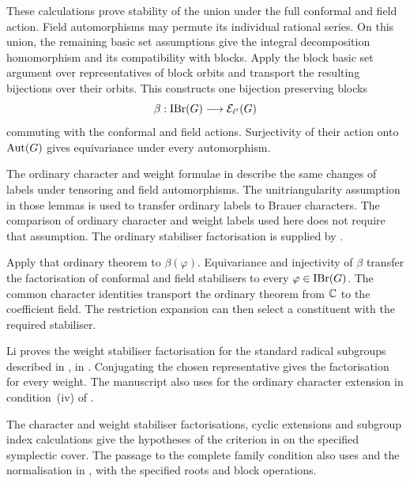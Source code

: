 These calculations prove stability of the union under the full conformal
and field action. Field automorphisms may permute its individual rational
series. On this union, the remaining basic set assumptions give the integral
decomposition homomorphism and its compatibility with blocks. Apply the
block basic set argument over representatives of block orbits and transport
the resulting bijections over their orbits.
This constructs one bijection preserving blocks
\[
 \beta:\operatorname{IBr}(G)\longrightarrow\mathcal E_{\ell'}(G)
\]
commuting with the conformal and field actions. Surjectivity of their
action onto $\operatorname{Aut}(G)$ gives equivariance under every automorphism.

The ordinary character and weight formulae in
\cite[proofs of Lemmas~5.1 and~5.3]{Li2021} describe the same changes of
labels under tensoring and field automorphisms. The unitriangularity
assumption in those lemmas is used to transfer ordinary labels to Brauer
characters. The comparison of ordinary character and weight labels used
here does not require that assumption.
The ordinary stabiliser factorisation is supplied by
\cite[Theorem~3.1]{CabanesSpath2017TypeC}.

Apply that ordinary theorem to $\beta(\varphi)$. Equivariance and
injectivity of $\beta$ transfer the factorisation of conformal and field
stabilisers to every $\varphi\in\operatorname{IBr}(G)$. The common character identities
transport the ordinary theorem from $\mathbb C$ to the coefficient field. The
restriction expansion can then select a constituent with the required
stabiliser.

Li proves the weight stabiliser factorisation for the standard radical
subgroups described in \cite[Section~2.C]{Li2021}, in
\cite[Lemma~5.5(1)]{Li2021}. Conjugating the chosen representative gives
the factorisation for every weight. The manuscript also uses
\cite[Lemma~5.5(2)]{Li2021} for the ordinary character extension in
condition~(iv) of \cite[Theorem~4.5]{BroughSpath2022}.

The character and weight stabiliser factorisations, cyclic extensions and
subgroup index calculations give the hypotheses of the criterion in
\cite[Theorem~4.5]{BroughSpath2022} on the specified symplectic cover.
The passage to the complete family condition also uses
\cite[Lemma~3.3]{KoshitaniSpath2016} and the normalisation in
\cite[Definition~4.1]{Spath2013}, with the specified roots and block
operations.

